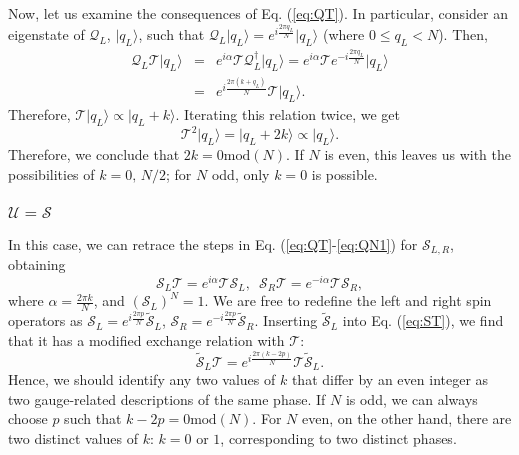 \documentclass[twocolumn,aps,prb,showpacs]{revtex4-1}
\begin{document}
Now, let us examine the consequences of Eq. (\ref{eq:QT}). In particular,
consider an eigenstate of $\mathcal{Q}_{L}$, $\vert q_{L}\rangle$,
such that $\mathcal{Q}_{L}\vert q_{L}\rangle=e^{i\frac{2\pi q_{L}}{N}}\vert q_{L}\rangle$
(where $0\le q_{L}<N$). Then,
\begin{eqnarray}
\mathcal{Q}_{L}\mathcal{T}\vert q_{L}\rangle & = & e^{i\alpha}\mathcal{T}\mathcal{Q}_{L}^{\dagger}\vert q_{L}\rangle=e^{i\alpha}\mathcal{T}e^{-i\frac{2\pi q_{L}}{N}}\vert q_{L}\rangle\nonumber \\
 & = & e^{i\frac{2\pi\left(k+q_{L}\right)}{N}}\mathcal{T}\vert q_{L}\rangle.
\end{eqnarray}
Therefore, $\mathcal{T}\vert q_{L}\rangle\propto\vert q_{L}+k\rangle$.
Iterating this relation twice, we get
\begin{equation}
\mathcal{T}^{2}\vert q_{L}\rangle=\vert q_{L}+2k\rangle\propto\vert q_{L}\rangle.
\end{equation}
Therefore, we conclude that $2k=0\mathrm{mod}(N)$. If $N$ is even,
this leaves us with the possibilities of $k=0,\,N/2$; for $N$ odd,
only $k=0$ is possible.



\subsubsection{$\mathcal{U=S}$}

In this case, we can retrace the steps in Eq. (\ref{eq:QT}-\ref{eq:QN1})
for $\mathcal{S}_{L,R}$, obtaining
\begin{equation}
\mathcal{S}_{L}\mathcal{T}=e^{i\alpha}\mathcal{T}\mathcal{S}_{L},\,\,\,\mathcal{S}_{R}\mathcal{T}=e^{-i\alpha}\mathcal{T}\mathcal{S}_{R},\label{eq:ST}
\end{equation}
where $\alpha=\frac{2\pi k}{N}$, and $\left(\mathcal{S}_{L}\right)^{N}=1$.
We are free to redefine the left and right spin operators as $\mathcal{S}_{L}=e^{i\frac{2\pi p}{N}}\tilde{\mathcal{S}}_{L}$,
$\mathcal{S}_{R}=e^{-i\frac{2\pi p}{N}}\tilde{\mathcal{S}}_{R}$.
Inserting $\tilde{\mathcal{S}}_{L}$ into Eq. (\ref{eq:ST}), we find
that it has a modified exchange relation with $\mathcal{T}$:
\begin{equation}
\tilde{\mathcal{S}}_{L}\mathcal{T}=e^{i\frac{2\pi\left(k-2p\right)}{N}}\mathcal{T}\tilde{\mathcal{S}}_{L}.
\end{equation}
Hence, we should identify any two values of $k$ that differ by an
even integer as two gauge-related descriptions of the same phase.
If $N$ is odd, we can always choose $p$ such that $k-2p=0\mathrm{mod}(N)$.
For $N$ even, on the other hand, there are two distinct values of
$k$: $k=0$ or $1$, corresponding to two distinct phases.
\end{document}

